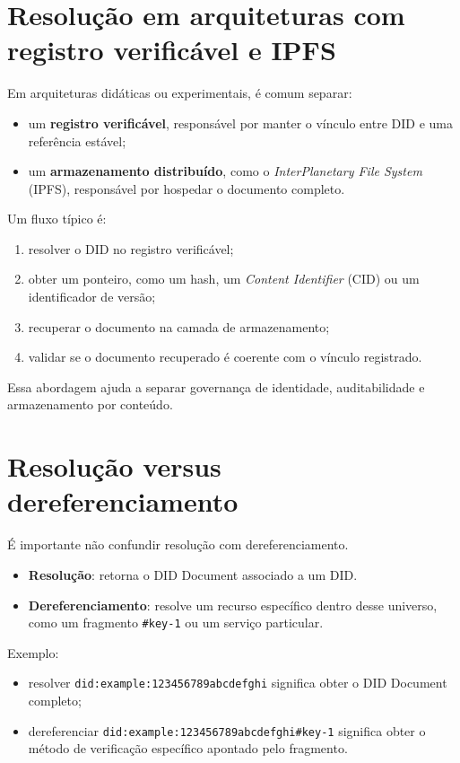 \section{Resolução em arquiteturas com registro verificável e IPFS}
Em arquiteturas didáticas ou experimentais, é comum separar:
\begin{itemize}[leftmargin=*]
  \item um \textbf{registro verificável}, responsável por manter o vínculo entre DID e uma referência estável;
  \item um \textbf{armazenamento distribuído}, como o \textit{InterPlanetary File System} (IPFS), responsável por hospedar o documento completo.
\end{itemize}

Um fluxo típico é:
\begin{enumerate}[leftmargin=*]
  \item resolver o DID no registro verificável;
  \item obter um ponteiro, como um hash, um \textit{Content Identifier} (CID) ou um identificador de versão;
  \item recuperar o documento na camada de armazenamento;
  \item validar se o documento recuperado é coerente com o vínculo registrado.
\end{enumerate}

Essa abordagem ajuda a separar governança de identidade, auditabilidade e armazenamento por conteúdo.

\section{Resolução versus dereferenciamento}
É importante não confundir resolução com dereferenciamento.
\begin{itemize}[leftmargin=*]
  \item \textbf{Resolução}: retorna o DID Document associado a um DID.
  \item \textbf{Dereferenciamento}: resolve um recurso específico dentro desse universo, como um fragmento \texttt{\#key-1} ou um serviço particular.
\end{itemize}

Exemplo:
\begin{itemize}[leftmargin=*]
  \item resolver \texttt{did:example:123456789abcdefghi} significa obter o DID Document completo;
  \item dereferenciar \texttt{did:example:123456789abcdefghi\#key-1} significa obter o método de verificação específico apontado pelo fragmento.
\end{itemize}

